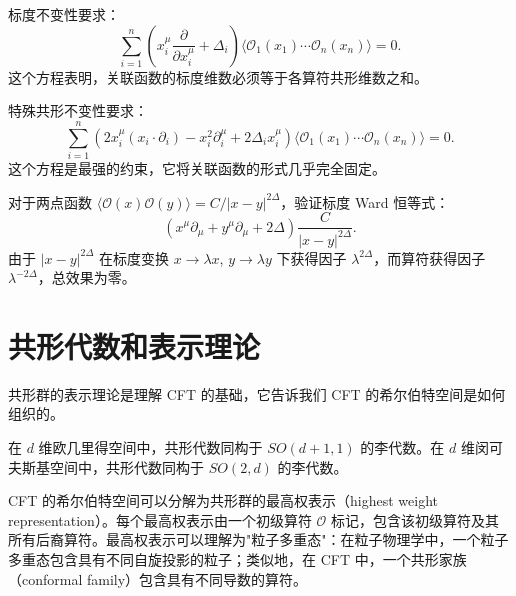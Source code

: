 \begin{theorem}
标度不变性要求：
\begin{equation}
    \sum_{i=1}^n \left( x_i^\mu \frac{\partial}{\partial x_i^\mu} + \Delta_i \right) \langle \mathcal{O}_1(x_1) \cdots \mathcal{O}_n(x_n) \rangle = 0.
\end{equation}
这个方程表明，关联函数的标度维数必须等于各算符共形维数之和。
\end{theorem}

\begin{theorem}
特殊共形不变性要求：
\begin{equation}
    \sum_{i=1}^n \left( 2x_i^\mu (x_i \cdot \partial_i) - x_i^2 \partial_i^\mu + 2\Delta_i x_i^\mu \right) \langle \mathcal{O}_1(x_1) \cdots \mathcal{O}_n(x_n) \rangle = 0.
\end{equation}
这个方程是最强的约束，它将关联函数的形式几乎完全固定。
\end{theorem}

\begin{example}
对于两点函数 $\langle \mathcal{O}(x) \mathcal{O}(y) \rangle = C/|x-y|^{2\Delta}$，验证标度 Ward 恒等式：
\begin{equation}
    \left( x^\mu \partial_\mu + y^\mu \partial_\mu + 2\Delta \right) \frac{C}{|x-y|^{2\Delta}}.
\end{equation}
由于 $|x-y|^{2\Delta}$ 在标度变换 $x \to \lambda x$, $y \to \lambda y$ 下获得因子 $\lambda^{2\Delta}$，而算符获得因子 $\lambda^{-2\Delta}$，总效果为零。
\end{example}

\section{共形代数和表示理论}

共形群的表示理论是理解 CFT 的基础，它告诉我们 CFT 的希尔伯特空间是如何组织的。

在 $d$ 维欧几里得空间中，共形代数同构于 $SO(d+1,1)$ 的李代数。在 $d$ 维闵可夫斯基空间中，共形代数同构于 $SO(2,d)$ 的李代数。

\begin{definition}[共形家族]
CFT 的希尔伯特空间可以分解为共形群的最高权表示（highest weight representation）。每个最高权表示由一个初级算符 $\mathcal{O}$ 标记，包含该初级算符及其所有后裔算符。最高权表示可以理解为"粒子多重态"：在粒子物理学中，一个粒子多重态包含具有不同自旋投影的粒子；类似地，在 CFT 中，一个共形家族（conformal family）包含具有不同导数的算符。
\end{definition}

